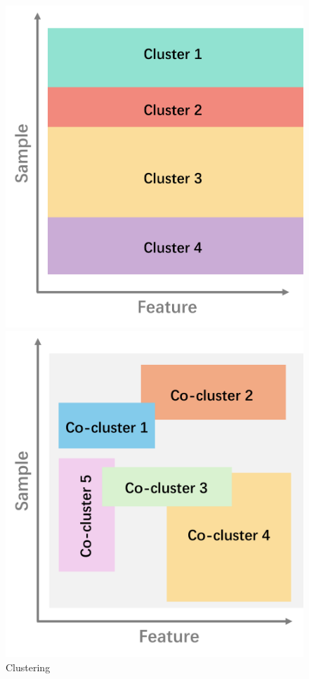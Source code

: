 \documentclass[journal]{IEEEtran}
\begin{document}
\begin{figure}[!t]
    \centering
    \begin{minipage}[b]{0.22\textwidth}
        \centering
        \includegraphics[width=\linewidth]{images/cluster.png}
        \caption{Clustering}
        \label{fig:cluster}
    \end{minipage}%
    \hfill
    \begin{minipage}[b]{0.22\textwidth}
        \centering
        \includegraphics[width=\linewidth]{images/coc.png}

\end{minipage}
\end{figure}
\end{document}
